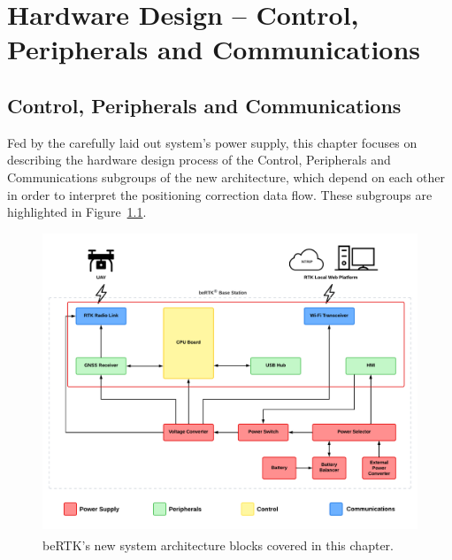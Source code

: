 

\chapter{Hardware Design -- Control, Peripherals and Communications}\label{cha:chapter4_C_PC}


\section{Control, Peripherals and Communications}\label{sec:41_C_PC}

Fed by the carefully laid out system's power supply, this chapter focuses on describing the hardware design process of the Control, Peripherals and Communications subgroups of the new architecture, which depend on each other in order to interpret the positioning correction data flow. These subgroups are highlighted in Figure~\ref{fig:architecture_new_C_PC}.

\begin{figure}[h]
	\centering
	\includegraphics[width=1.0\textwidth]{Chapters/Figures/chapter3/Chapter4_bloackDiagram.pdf}
	\caption{beRTK\textsuperscript{\textregistered}'s new system architecture blocks covered in this chapter.}
	\label{fig:architecture_new_C_PC}
\end{figure}

